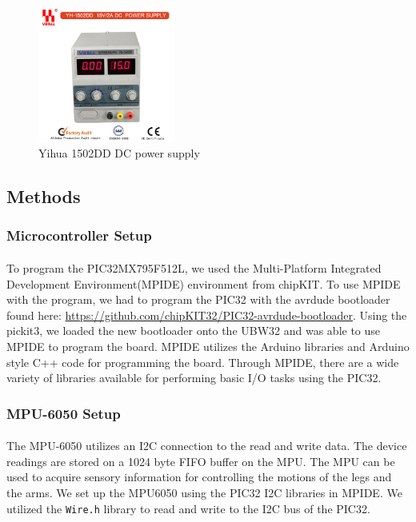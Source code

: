 \documentclass[letterpaper,12pt]{article}
\begin{document}
\begin{figure}
  \centering
    \includegraphics[width=0.4\textwidth]{figures/Power_Supply_YIHUA_1502DD.jpg}
  \caption{Yihua 1502DD DC power supply}
  \label{yihuafig}
\end{figure}

\subsection{Methods}
\subsubsection{Microcontroller Setup}
\paragraph{}To program the PIC32MX795F512L, we used the Multi-Platform
Integrated Development Environment(MPIDE) environment from chipKIT. To use MPIDE
with the program, we had to program the PIC32 with the avrdude bootloader found
here: \url{https://github.com/chipKIT32/PIC32-avrdude-bootloader}. Using the
pickit3, we loaded the new bootloader onto the UBW32 and was able to use MPIDE
to program the board. MPIDE utilizes the Arduino libraries and Arduino style C++
code for programming the board. Through MPIDE, there are a wide variety of
libraries available for performing basic I/O tasks using the PIC32.

\subsubsection{MPU-6050 Setup}
\paragraph{}The MPU-6050 utilizes an I2C connection to the read and write data.
The device readings are stored on a 1024 byte FIFO buffer on the
MPU\cite{mpu6050data}. The MPU can be used to acquire sensory information for
controlling the motions of the legs and the arms. We set up the MPU6050 using
the PIC32 I2C libraries in MPIDE. We utilized the \verb!Wire.h! library to read
and write to the I2C bus of the PIC32\cite{Krodal2013}.
\end{document}

